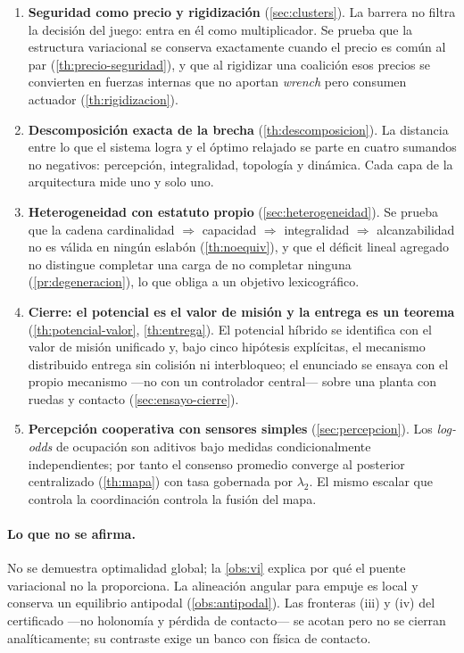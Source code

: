 \documentclass[11pt,a4paper]{article}
\theoremstyle{plain}
\theoremstyle{definition}
\theoremstyle{remark}
\begin{document}
\begin{enumerate}[leftmargin=1.9em,itemsep=0.35em]
  \item \textbf{Seguridad como precio y rigidización}
  (\cref{sec:clusters}). La barrera no filtra la decisión del juego: entra en él
  como multiplicador. Se prueba que la estructura variacional se conserva
  exactamente cuando el precio es común al par (\cref{th:precio-seguridad}), y
  que al rigidizar una coalición esos precios se convierten en fuerzas internas
  que no aportan \emph{wrench} pero consumen actuador
  (\cref{th:rigidizacion}).

  \item \textbf{Descomposición exacta de la brecha} (\cref{th:descomposicion}).
  La distancia entre lo que el sistema logra y el óptimo relajado se parte en
  cuatro sumandos no negativos: percepción, integralidad, topología y dinámica.
  Cada capa de la arquitectura mide uno y solo uno.

  \item \textbf{Heterogeneidad con estatuto propio}
  (\cref{sec:heterogeneidad}). Se prueba que la cadena
  cardinalidad $\Rightarrow$ capacidad $\Rightarrow$ integralidad $\Rightarrow$
  alcanzabilidad
  no es válida en ningún eslabón (\cref{th:noequiv}), y que el déficit lineal
  agregado no distingue completar una carga de no completar ninguna
  (\cref{pr:degeneracion}), lo que obliga a un objetivo lexicográfico.

  \item \textbf{Cierre: el potencial es el valor de misión y la entrega es un teorema}
  (\cref{th:potencial-valor}, \cref{th:entrega}). El potencial híbrido se identifica con
  el valor de misión unificado y, bajo cinco hipótesis explícitas, el mecanismo
  distribuido entrega sin colisión ni interbloqueo; el enunciado se ensaya con el propio
  mecanismo —no con un controlador central— sobre una planta con ruedas y contacto
  (\cref{sec:ensayo-cierre}).

  \item \textbf{Percepción cooperativa con sensores simples}
  (\cref{sec:percepcion}). Los \emph{log-odds} de ocupación son aditivos bajo
  medidas condicionalmente independientes; por tanto el consenso promedio
  converge al posterior centralizado (\cref{th:mapa}) con tasa gobernada por
  $\lambda_2$. El mismo escalar que controla la coordinación controla la
  fusión del mapa.
\end{enumerate}

\paragraph{Lo que no se afirma.} No se demuestra optimalidad global; la
\cref{obs:vi} explica por qué el puente variacional no la proporciona. La
alineación angular para empuje es local y conserva un equilibrio antipodal
(\cref{obs:antipodal}). Las fronteras (iii) y (iv) del certificado
—no holonomía y pérdida de contacto— se acotan pero no se cierran
analíticamente; su contraste exige un banco con física de contacto.
\end{document}
